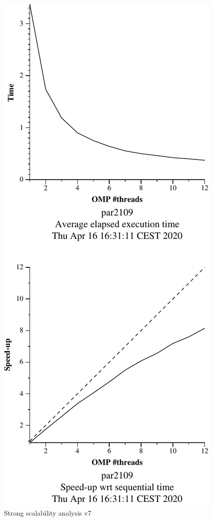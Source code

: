 \begin{figure}[H]
    \begin{minipage}{0.5\textwidth}
        \centering
        \includegraphics[width=0.7\linewidth]{plots/v7-crop.pdf}
        \caption{Strong scalability analysis v7}
        \label{fig:ssa_v7} 
    \end{minipage}
    \begin{minipage}{0.5\textwidth}
        \centering

\end{minipage}
\end{figure}
